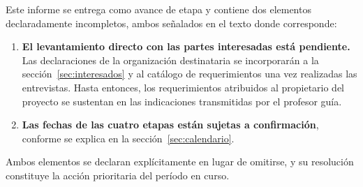 \begin{cajaaviso}[title={Estado del documento}]
Este informe se entrega como avance de etapa y contiene dos elementos declaradamente incompletos, ambos
señalados en el texto donde corresponde:

\begin{enumerate}
\item \textbf{El levantamiento directo con las partes interesadas está pendiente.} Las declaraciones de
la organización destinataria se incorporarán a la sección~\ref{sec:interesados} y al catálogo de
requerimientos una vez realizadas las entrevistas. Hasta entonces, los requerimientos atribuidos al
propietario del proyecto se sustentan en las indicaciones transmitidas por el profesor guía.

\item \textbf{Las fechas de las cuatro etapas están sujetas a confirmación}, conforme se explica en la
sección~\ref{sec:calendario}.
\end{enumerate}

Ambos elementos se declaran explícitamente en lugar de omitirse, y su resolución constituye la acción
prioritaria del período en curso.
\end{cajaaviso}
